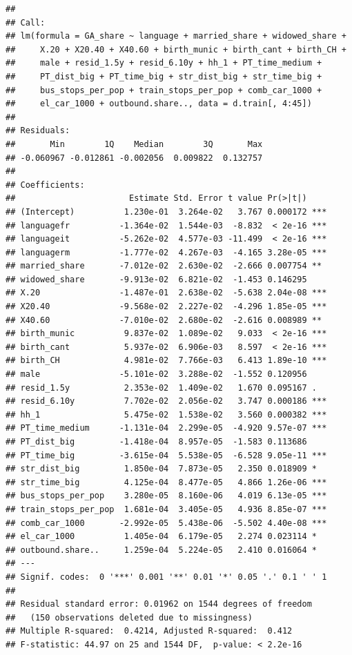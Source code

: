 \documentclass[
]{article}
\begin{document}
\begin{verbatim}
## 
## Call:
## lm(formula = GA_share ~ language + married_share + widowed_share + 
##     X.20 + X20.40 + X40.60 + birth_munic + birth_cant + birth_CH + 
##     male + resid_1.5y + resid_6.10y + hh_1 + PT_time_medium + 
##     PT_dist_big + PT_time_big + str_dist_big + str_time_big + 
##     bus_stops_per_pop + train_stops_per_pop + comb_car_1000 + 
##     el_car_1000 + outbound.share.., data = d.train[, 4:45])
## 
## Residuals:
##       Min        1Q    Median        3Q       Max 
## -0.060967 -0.012861 -0.002056  0.009822  0.132757 
## 
## Coefficients:
##                       Estimate Std. Error t value Pr(>|t|)    
## (Intercept)          1.230e-01  3.264e-02   3.767 0.000172 ***
## languagefr          -1.364e-02  1.544e-03  -8.832  < 2e-16 ***
## languageit          -5.262e-02  4.577e-03 -11.499  < 2e-16 ***
## languagerm          -1.777e-02  4.267e-03  -4.165 3.28e-05 ***
## married_share       -7.012e-02  2.630e-02  -2.666 0.007754 ** 
## widowed_share       -9.913e-02  6.821e-02  -1.453 0.146295    
## X.20                -1.487e-01  2.638e-02  -5.638 2.04e-08 ***
## X20.40              -9.568e-02  2.227e-02  -4.296 1.85e-05 ***
## X40.60              -7.010e-02  2.680e-02  -2.616 0.008989 ** 
## birth_munic          9.837e-02  1.089e-02   9.033  < 2e-16 ***
## birth_cant           5.937e-02  6.906e-03   8.597  < 2e-16 ***
## birth_CH             4.981e-02  7.766e-03   6.413 1.89e-10 ***
## male                -5.101e-02  3.288e-02  -1.552 0.120956    
## resid_1.5y           2.353e-02  1.409e-02   1.670 0.095167 .  
## resid_6.10y          7.702e-02  2.056e-02   3.747 0.000186 ***
## hh_1                 5.475e-02  1.538e-02   3.560 0.000382 ***
## PT_time_medium      -1.131e-04  2.299e-05  -4.920 9.57e-07 ***
## PT_dist_big         -1.418e-04  8.957e-05  -1.583 0.113686    
## PT_time_big         -3.615e-04  5.538e-05  -6.528 9.05e-11 ***
## str_dist_big         1.850e-04  7.873e-05   2.350 0.018909 *  
## str_time_big         4.125e-04  8.477e-05   4.866 1.26e-06 ***
## bus_stops_per_pop    3.280e-05  8.160e-06   4.019 6.13e-05 ***
## train_stops_per_pop  1.681e-04  3.405e-05   4.936 8.85e-07 ***
## comb_car_1000       -2.992e-05  5.438e-06  -5.502 4.40e-08 ***
## el_car_1000          1.405e-04  6.179e-05   2.274 0.023114 *  
## outbound.share..     1.259e-04  5.224e-05   2.410 0.016064 *  
## ---
## Signif. codes:  0 '***' 0.001 '**' 0.01 '*' 0.05 '.' 0.1 ' ' 1
## 
## Residual standard error: 0.01962 on 1544 degrees of freedom
##   (150 observations deleted due to missingness)
## Multiple R-squared:  0.4214, Adjusted R-squared:  0.412 
## F-statistic: 44.97 on 25 and 1544 DF,  p-value: < 2.2e-16
\end{verbatim}
\end{document}
